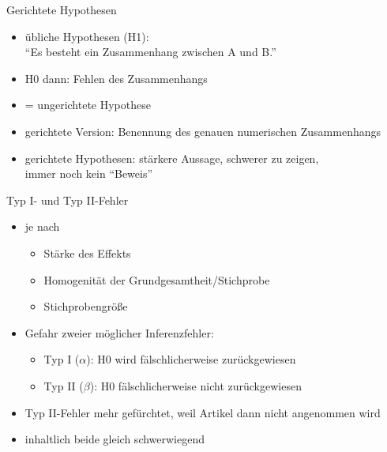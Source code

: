 \begin{frame}
  {Gerichtete Hypothesen}
  \begin{itemize}[<+->]
    \item übliche Hypothesen (H1):\\
      "`Es besteht ein Zusammenhang zwischen A und B."'
    \item H0 dann: Fehlen des Zusammenhangs
    \item = \alert{ungerichtete Hypothese}
    \item gerichtete Version: Benennung des genauen numerischen Zusammenhangs
    \item gerichtete Hypothesen: stärkere Aussage, schwerer zu zeigen,\\
      immer noch kein "`Beweis"'
  \end{itemize}
\end{frame}

\begin{frame}
  {Typ I- und Typ II-Fehler}
  \begin{itemize}[<+->]
    \item je nach
      \begin{itemize}[<+->]
	\item \alert{Stärke des Effekts}
	\item \alert{Homogenität} der Grundgesamtheit\slash Stichprobe
	\item \alert{Stichprobengröße}
      \end{itemize}
    \item Gefahr zweier möglicher Inferenzfehler:
      \begin{itemize}[<+->]
	\item \alert{Typ I ($\alpha$)}: H0 wird fälschlicherweise zurückgewiesen
	\item \alert{Typ II ($\beta$)}: H0 fälschlicherweise \alert{nicht} zurückgewiesen
      \end{itemize}
    \item Typ II-Fehler mehr gefürchtet, weil Artikel dann nicht angenommen wird
    \item inhaltlich beide gleich schwerwiegend
  \end{itemize}
\end{frame}

